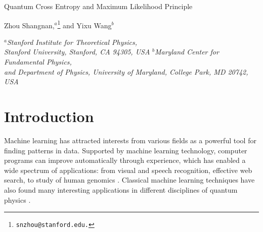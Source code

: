 \documentclass[11pt]{article}
\theoremstyle{definition}
\renewcommand{\title}[1]{\vbox{\center\LARGE{#1}}\vspace{5mm}}
\newcommand{\address}[1]{\vbox{\center\em#1}}
\begin{document}
\title{Quantum Cross Entropy and Maximum Likelihood Principle}

\begin{center}
\vspace{5mm}
Zhou Shangnan,$^{a}$\footnote{\tt snzhou@stanford.edu.} and Yixu Wang$^{b}$ 
\end{center}


\address{${}^a$Stanford Institute for Theoretical Physics, \\
Stanford University, Stanford, CA 94305, USA}
\address{${}^{b}$Maryland Center for Fundamental Physics, \\
and Department of Physics, University of Maryland, College Park, MD 20742, USA}

\date{\today}
\vspace{5mm}


\begin{abstract}
    Quantum machine learning is an emerging field at the intersection of machine learning and quantum computing. Classical cross entropy plays a central role in machine learning. We define its quantum generalization, the quantum cross entropy, prove its lower bounds, and investigate its relation to quantum fidelity. 
    In the classical case, minimizing cross entropy is equivalent to maximizing likelihood. 
    In the quantum case, when the quantum cross entropy is constructed from quantum data undisturbed by quantum measurements, this relation holds. 
    Classical cross entropy is equal to negative log-likelihood. 
    When we obtain quantum cross entropy through empirical density matrix based on measurement outcomes, the quantum cross entropy is lower-bounded by negative log-likelihood. 
    These two different scenarios illustrate the information loss when making quantum measurements. We conclude that to achieve the goal of full quantum machine learning, it is crucial to utilize the deferred measurement principle.
\end{abstract}


\section{Introduction}

Machine learning has attracted interests from various fields as a powerful tool for finding patterns in data. Supported by machine learning technology, computer programs can improve automatically through experience, which has enabled a wide spectrum of applications: from visual and speech recognition, effective web search, to study of human genomics \cite{lecun2015deep,alphafold}. Classical machine learning techniques have also found many interesting applications in different disciplines of quantum physics \cite{MLtomo,manybody,phasematter,QMBstateDNN,MLPhaseTrans,MLTopoState,MLNNQST,MLdeepmatrices}.
\end{document}
